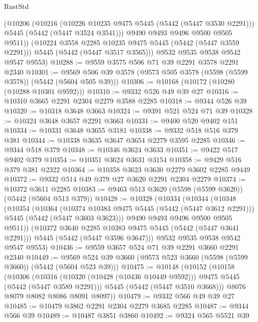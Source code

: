 \begin{lexlean}{RustStd}
\begin{coremodule}
          (@10206
            (@10216
              (@10226 @10235 @9475 @5445 (@5442 (@5447 @3530 @2291)))
              @5445
              (@5442 (@5447 @3524 @3541)))
            @9490
            @9493
            @9496
            @9500
            @9505
            @9511))
        (@10224 @3558 @2285 @10235 @9475 @5445 (@5442 (@5447 @3559 @2291)))
        @5445
        (@5442 (@5447 @3517 @3565)))
      @9532
      @9535
      @9538
      @9542
      @9547
      @9553)
@10288 := @9559 @3575 @506 @71 @39 @2291 @3578 @2291 @2340
@10301 := @9569 @506 @39 @3578 (@9573 @505 @3578 (@5598 (@5599 @3578)) (@5442 (@5604 @505 @39)))
@10306 := @10168 (@10172 (@10280 (@10288 @10301 @9592)))
@10310 := @9332 @526 @49 @39 @27
@10316 := @10310 @3665 @2291 @2304 @2279 @3588 @2285
@10318 := @9344 @526 @39
@10320 := @10318 @3648 @3663
@10324 := @9391 @521 @524 @71 @39
@10328 := @10324 @3648 @3657 @2291 @3663
@10331 := @9400 @520 @9402 @151
@10334 := @10331 @3648 @3655 @3181
@10338 := @9332 @518 @516 @379 @381
@10344 := @10338 @3635 @3647 @3654 @2279 @3595 @2285
@10346 := @9344 @518 @379
@10348 := @10346 @3624 @3633
@10351 := @9422 @517 @9402 @379
@10354 := @10351 @3624 @3631 @3154
@10358 := @9429 @516 @379 @381 @2322
@10364 := @10358 @3623 @3630 @2279 @3602 @2285 @9449
@10372 := @9332 @514 @49 @379 @27 @3620 @2291 @2304 @2279
@10374 := @10372 @3611 @2285
@10383 := @9463 @513 @3620 (@5598 (@5599 @3620)) (@5442 (@5604 @513 @379))
@10428 := @10328
    (@10334
      (@10344
        (@10348
          (@10354
            (@10364
              (@10374 @10383 @9475 @5445 (@5442 (@5447 @3612 @2291)))
              @5445
              (@5442 (@5447 @3603 @3623)))
            @9490
            @9493
            @9496
            @9500
            @9505
            @9511))
        (@10372 @3640 @2285 @10383 @9475 @5445 (@5442 (@5447 @3641 @2291)))
        @5445
        (@5442 (@5447 @3596 @3647)))
      @9532
      @9535
      @9538
      @9542
      @9547
      @9553)
@10436 := @9559 @3657 @524 @71 @39 @2291 @3660 @2291 @2340
@10449 := @9569 @524 @39 @3660 (@9573 @523 @3660 (@5598 (@5599 @3660)) (@5442 (@5604 @523 @39)))
@10475 := @10148
    (@10152
      (@10158
        (@10306
          (@10316 (@10320 (@10428 (@10436 @10449 @9592))) @9475 @5445 (@5442 (@5447 @3589 @2291)))
          @5445
          (@5442 (@5447 @3510 @3668)))
        @8076
        @8079
        @8082
        @8086
        @8091
        @8097))
@10479 := @9332 @566 @49 @39 @27
@10485 := @10479 @3862 @2291 @2304 @2279 @3685 @2285
@10487 := @9344 @566 @39
@10489 := @10487 @3851 @3860
@10492 := @9324 @565 @5521 @39

\end{coremodule}
\end{lexlean}
